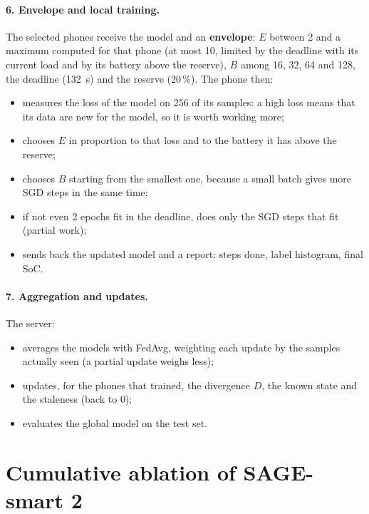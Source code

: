 \documentclass[11pt,a4paper]{article}
\begin{document}
\paragraph{6. Envelope and local training.}
The selected phones receive the model and an \textbf{envelope}: $E$ between 2
and a maximum computed for that phone (at most 10, limited by the deadline
with its current load and by its battery above the reserve), $B$ among 16, 32,
64 and 128, the deadline (\SI{132}{s}) and the reserve (20\,\%). The phone then:
\begin{itemize}
  \item measures the loss of the model on 256 of its samples: a high loss means
        that its data are new for the model, so it is worth working more;
  \item chooses $E$ in proportion to that loss and to the battery it has above
        the reserve;
  \item chooses $B$ starting from the smallest one, because a small batch gives
        more SGD steps in the same time;
  \item if not even 2 epochs fit in the deadline, does only the SGD steps that
        fit (partial work);
  \item sends back the updated model and a report: steps done, label
        histogram, final SoC.
\end{itemize}

\paragraph{7. Aggregation and updates.}
The server:
\begin{itemize}
  \item averages the models with FedAvg, weighting each update by the samples
        actually seen (a partial update weighs less);
  \item updates, for the phones that trained, the divergence $D$, the known
        state and the staleness (back to 0);
  \item evaluates the global model on the test set.
\end{itemize}

\newpage

\section{Cumulative ablation of SAGE-smart 2}
\label{sec:ablation}
\end{document}
